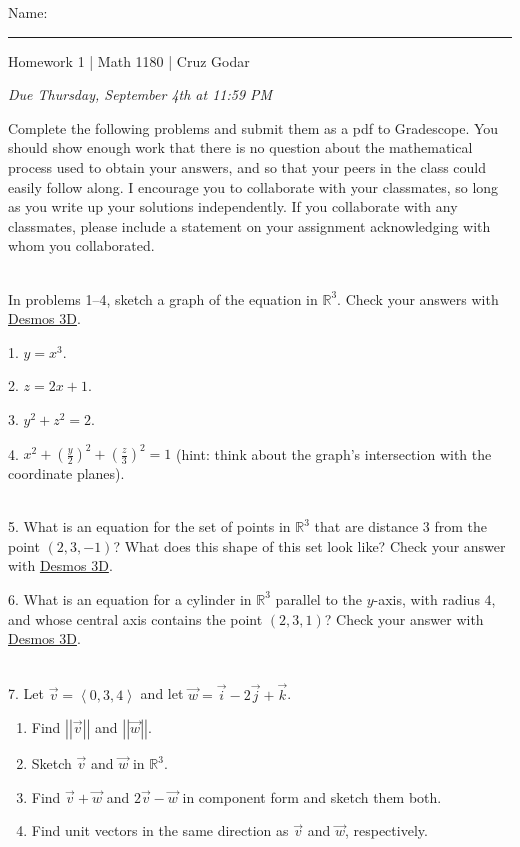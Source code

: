 \documentclass{article}
\begin{document}
\Large Name: \rule{2in}{0.15mm} \hfill Homework 1 | Math 1180 | Cruz Godar \vspace{4pt} \normalsize

\textit{Due Thursday, September 4th at 11:59 PM}

Complete the following problems and submit them as a pdf to Gradescope. You should show enough work that there is no question about the mathematical process used to obtain your answers, and so that your peers in the class could easily follow along. I encourage you to collaborate with your classmates, so long as you write up your solutions independently. If you collaborate with any classmates, please include a statement on your assignment acknowledging with whom you collaborated.

~\\

In problems 1--4, sketch a graph of the equation in $\mathbb{R}^3$. Check your answers with \href{https://www.desmos.com/3d}{Desmos 3D}.

1. $\displaystyle y = x^3$.

2. $\displaystyle z = 2x + 1$.

3. $\displaystyle y^2 + z^2 = 2$.

4. $\displaystyle x^2 + \left( \frac{y}{2} \right)^2 + \left( \frac{z}{3} \right)^2 = 1$ (hint: think about the graph's intersection with the coordinate planes).

~\\

5. What is an equation for the set of points in $\mathbb{R}^3$ that are distance $3$ from the point $(2, 3, -1)$? What does this shape of this set look like? Check your answer with \href{https://www.desmos.com/3d}{Desmos 3D}.

6. What is an equation for a cylinder in $\mathbb{R}^3$ parallel to the $y$-axis, with radius $4$, and whose central axis contains the point $(2, 3, 1)$? Check your answer with \href{https://www.desmos.com/3d}{Desmos 3D}.

~\\

7. Let $\vec{v} = \left< 0, 3, 4 \right>$ and let $\vec{w} = \vec{i} - 2\vec{j} + \vec{k}$.

\begin{enumerate}

	\item Find $\left| \left| \vec{v} \right| \right|$ and $\left| \left| \vec{w} \right| \right|$.

	\item Sketch $\vec{v}$ and $\vec{w}$ in $\mathbb{R}^3$.

	\item Find $\vec{v} + \vec{w}$ and $2\vec{v} - \vec{w}$ in component form and sketch them both.

	\item Find unit vectors in the same direction as $\vec{v}$ and $\vec{w}$, respectively.

\end{enumerate}
\end{document}
